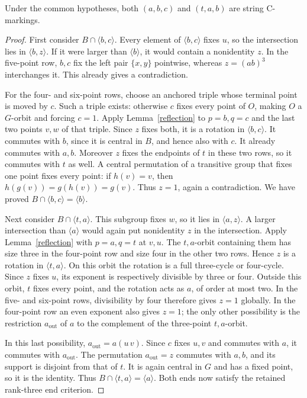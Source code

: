 \documentclass[a4paper,11pt]{article}
\newcommand{\gen}[1]{\langle#1\rangle}
\begin{document}
\begin{lemma}\label{ends}
Under the common hypotheses, both $(a,b,c)$ and $(t,a,b)$ are
string C-markings.
\end{lemma}
\begin{proof}
First consider $B\cap\gen{b,c}$. Every element of $\gen{b,c}$ fixes
$u$, so the intersection lies in $\gen{b,z}$. If it were larger than
$\gen b$, it would contain a nonidentity $z$.
In the five-point row, $b,c$ fix the left pair $\{x,y\}$ pointwise,
whereas $z=(ab)^3$ interchanges it. This already gives a contradiction.

For the four- and six-point rows, choose an anchored triple whose terminal
point is moved by $c$. Such a triple exists: otherwise $c$ fixes every
point of $O$, making $O$ a $G$-orbit and forcing $c=1$. Apply
Lemma~\ref{reflection} to $p=b,q=c$ and the last two points $v,w$ of
that triple. Since $z$ fixes both, it is a rotation in $\gen{b,c}$.
It commutes with $b$, since it is central in $B$, and hence also with
$c$. It already commutes with $a,b$. Moreover $z$ fixes the endpoints
of $t$ in these two rows, so it commutes with $t$ as well. A central
permutation of a transitive group that fixes one point fixes every point:
if $h(v)=v$, then $h(g(v))=g(h(v))=g(v)$. Thus $z=1$, again a contradiction.
We have proved $B\cap\gen{b,c}=\gen b$.

Next consider $B\cap\gen{t,a}$. This subgroup fixes $w$, so it lies
in $\gen{a,z}$. A larger intersection than $\gen a$ would again put
nonidentity $z$ in the intersection. Apply Lemma~\ref{reflection} with
$p=a,q=t$ at $v,u$. The $t,a$-orbit containing them has size three in
the four-point row and size four in the other two rows. Hence $z$ is a
rotation in $\gen{t,a}$. On this orbit the rotation is a full three-cycle
or four-cycle. Since $z$ fixes $u$, its exponent is respectively divisible
by three or four. Outside this orbit, $t$ fixes
every point, and the rotation acts as $a$, of order at most two.
In the five- and six-point rows, divisibility by four therefore gives
$z=1$ globally. In the four-point row an even exponent also gives $z=1$;
the only other possibility is the restriction $a_{\mathrm{out}}$ of $a$
to the complement of the three-point $t,a$-orbit.

In this last possibility, $a_{\mathrm{out}}=a(u\,v)$. Since $c$ fixes
$u,v$ and commutes with $a$, it commutes with $a_{\mathrm{out}}$.
The permutation $a_{\mathrm{out}}=z$ commutes with $a,b$, and its support
is disjoint from that of $t$. It is again central in $G$ and has a fixed
point, so it is the identity. Thus $B\cap\gen{t,a}=\gen a$.
Both ends now satisfy the retained rank-three end criterion.
\end{proof}
\end{document}
